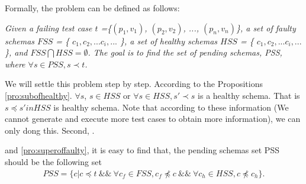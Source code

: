 %

Formally, the problem can be defined as follows:

\emph{Given a failing test case $t$ =\{$(p_{1}, v_{1})$, $(p_{2}, v_{2})$, ..., $(p_{n}, v_{n})$\}, a set of faulty schemas $FSS$ = \{ $c_{1}, c_{2}, ... c_{i}, ...$ \},  a set of healthy schemas $HSS$ = \{ $c_{1}, c_{2}, ... c_{i}, ...$ \}, and $FSS \bigcap HSS = \emptyset$. The goal is to find the set of pending schemas, PSS, where $\forall s \in PSS, s \prec t$.}




We will settle this problem step by step. According to the Propositions \ref{pro:subofhealthy}. $\forall s $, $s \in HSS$ or $\forall s \in HSS, s' \prec s$ is a healthy schema. That is $s \preceq s' in HSS$ is healthy schema. Note that according to these information (We cannot generate and execute more test cases to obtain more information), we can only dong this. Second, .

 and \ref{pro:superoffaulty}, it is easy to find that, the pending schemas set PSS should be the following set
\begin{equation}
\begin{aligned}\label{eq:pssfirst}
PSS=\{ c | c \preceq t\ \&\&\ \forall c_{f} \in FSS,  c_{f} \npreceq c  \ \&\&\  \forall c_{h} \in HSS, c \npreceq c_{h} \} .
\end{aligned}
\end{equation}

